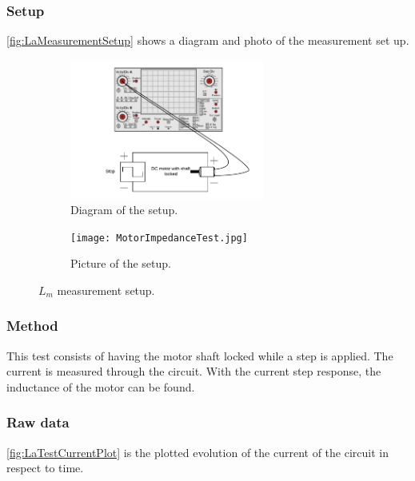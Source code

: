 \subsubsection*{Setup}
\autoref{fig:LaMeasurementSetup} shows a diagram and photo of the measurement set up.
\begin{figure}[htbp]
	\centering
	\begin{subfigure}{0.50\textwidth}
		\includegraphics[width=0.7\textwidth]{figures/appendix/Motor&GearTests/LmDiagram}
		\caption{Diagram of the setup.} \label{fig:LaMeasurementDiagram}
	\end{subfigure}
	\begin{subfigure}{0.40\textwidth}
		\texttt{[image: MotorImpedanceTest.jpg]}
		\caption{Picture of the setup.} \label{fig:LaMeasurementPictures}
	\end{subfigure}
	\caption{$L_m$ measurement setup.} \label{fig:LaMeasurementSetup}   
\end{figure}

\subsubsection*{Method}
This test consists of having the motor shaft locked while a step is applied. The current is measured through the circuit. With the current step response, the inductance of the motor can be found. 
\subsubsection*{Raw data}
\autoref{fig:LaTestCurrentPlot} is the plotted evolution of the current of the circuit in respect to time.


